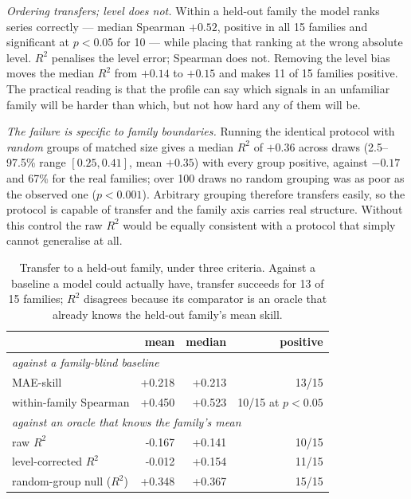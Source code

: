 \documentclass[11pt,a4paper]{article}
\newcommand{\num}[1]{#1}
\begin{document}
\emph{Ordering transfers; level does not.} Within a held-out family the model
ranks series correctly --- median Spearman \(+0.52\), positive in all
\num{15} families and significant at \(p<0.05\) for \num{10} --- while
placing that ranking at the wrong absolute level. \(R^2\) penalises the level
error; Spearman does not. Removing the level bias moves the median \(R^2\) from
\(+0.14\) to \(+0.15\) and makes \num{11} of \num{15} families positive. The
practical reading is that the profile can say which signals in an unfamiliar
family will be harder than which, but not how hard any of them will be.

\emph{The failure is specific to family boundaries.} Running the identical
protocol with \emph{random} groups of matched size gives a median \(R^2\) of
\(+0.36\) across draws (2.5--97.5\% range \([0.25, 0.41]\), mean \(+0.35\))
with every group positive,
against \(-0.17\) and \num{67}\% for the real families; over \num{100} draws
no random grouping was as poor as the observed one (\(p<0.001\)). Arbitrary
grouping therefore transfers easily, so the protocol is capable of transfer and
the family axis carries real structure. Without this control the raw \(R^2\)
would be equally consistent with a protocol that simply cannot generalise at
all.

\begin{table}[t]
\centering
\caption{Transfer to a held-out family, under three criteria. Against a
baseline a model could actually have, transfer succeeds for \num{13} of
\num{15} families; \(R^2\) disagrees because its comparator is an oracle that
already knows the held-out family's mean skill.}
\label{tab:transfer}
\small
\begin{tabular}{lrrr}
\toprule
 & mean & median & positive \\
\midrule
\multicolumn{4}{l}{\emph{against a family-blind baseline}}\\
MAE-skill                   & \num{+0.218} & \num{+0.213} & 13/15 \\
within-family Spearman      & \num{+0.450} & \num{+0.523} & 10/15 at \(p<0.05\) \\
\midrule
\multicolumn{4}{l}{\emph{against an oracle that knows the family's mean}}\\
raw \(R^2\)                 & \num{-0.167} & \num{+0.141} & 10/15 \\
level-corrected \(R^2\)     & \num{-0.012} & \num{+0.154} & 11/15 \\
\midrule
random-group null (\(R^2\)) & \num{+0.348} & \num{+0.367} & 15/15 \\
\bottomrule
\end{tabular}
\end{table}
\end{document}
